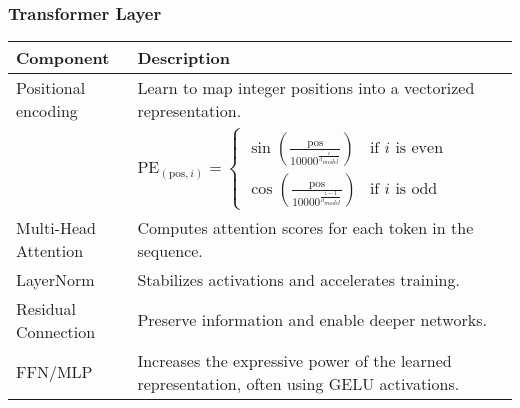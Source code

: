 \subsubsection{Transformer Layer}
\begin{summary}
    \vspace{-1em}
    \begin{center}
        \begin{tabular}{ll}
            \toprule
            \textbf{Component} & \textbf{Description} \\
            \midrule
            Positional encoding & Learn to map integer positions into a vectorized representation. \\
            & $\text{PE}_{(\text{pos},i)} = 
            \begin{cases}
                \sin\left(\frac{\text{pos}}{10000^{\frac{i}{d_{model}}}}\right) & \text{if } i \text{ is even} \\
                \cos\left(\frac{\text{pos}}{10000^{\frac{i-1}{d_{model}}}}\right) & \text{if } i \text{ is odd}
            \end{cases}$ \\
            \midrule
            Multi-Head Attention & Computes attention scores for each token in the sequence. \\
            \midrule
            LayerNorm & Stabilizes activations and accelerates training. \\
            \midrule
            Residual Connection & Preserve information and enable deeper networks. \\
            \midrule
            FFN/MLP & Increases the expressive power of the learned representation, often using GELU activations. \\
            \bottomrule
        \end{tabular}
    \end{center}
\end{summary}

